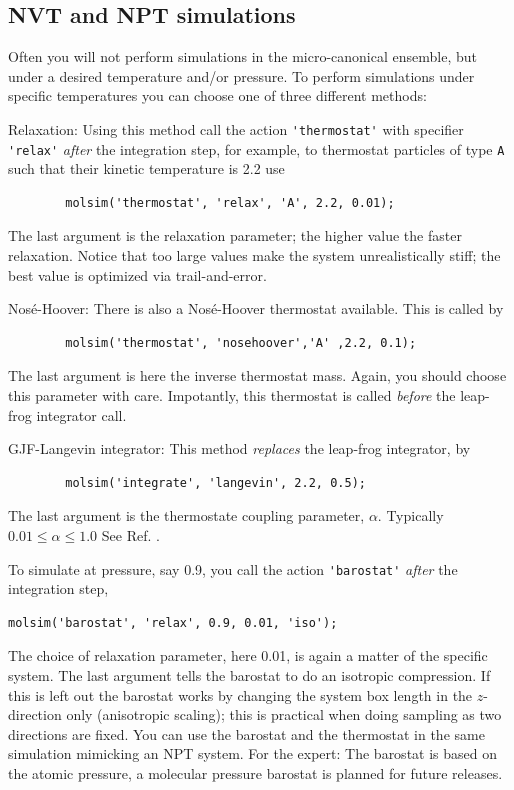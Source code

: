 \documentclass[11pt]{article}
\begin{document}
\subsection{NVT and NPT simulations}
Often you will not perform simulations in the micro-canonical
ensemble, but under a desired temperature and/or pressure. To perform
simulations under specific temperatures you can choose one of three
different methods:
\begin{description}
	\item{Relaxation:} 
		Using this method call the action \verb!'thermostat'! with specifier
		\verb!'relax'! \emph{after} the integration step, for example, to thermostat particles of type 
		\verb!A! such that their kinetic temperature is 2.2 use 
		\begin{verbatim}
		molsim('thermostat', 'relax', 'A', 2.2, 0.01);
		\end{verbatim}
		The last argument is the relaxation parameter; the higher value the faster
		relaxation. Notice that too large values make the system unrealistically
		stiff; the best value is optimized via trail-and-error. 
	\item{Nos\'{e}-Hoover:} 
		There is also a Nos\'{e}-Hoover thermostat available. This 
		is called by 
		\begin{verbatim}
		molsim('thermostat', 'nosehoover','A' ,2.2, 0.1);
		\end{verbatim}
		The last argument is here the inverse thermostat mass. Again, you should choose this parameter with care.
		Impotantly, this thermostat is called \emph{before} the leap-frog integrator call.
	\item{GJF-Langevin integrator:}
		This method \emph{replaces} the leap-frog integrator, by 
		\begin{verbatim}
		molsim('integrate', 'langevin', 2.2, 0.5);
		\end{verbatim}
		The last argument is the thermostate coupling parameter, $\alpha$. Typically $0.01 \leq \alpha \leq 1.0$ 
		See Ref. \cite{gjf}.
\end{description}

To simulate at pressure, say 0.9, you call the action \verb!'barostat'! 
\emph{after} the integration step,
\begin{verbatim}
molsim('barostat', 'relax', 0.9, 0.01, 'iso');
\end{verbatim}
The choice of relaxation parameter, here 0.01, is again a matter of the specific
system. The last argument tells the barostat to do an isotropic compression. If
this is left out the barostat works by changing the system box length in the
$z$-direction only (anisotropic scaling); this is practical when doing sampling
as two directions are fixed. You can use the barostat and the thermostat
in the same simulation mimicking an NPT system. For the expert: The barostat is
based on the atomic pressure, a molecular pressure barostat is planned for
future releases. 
\end{document}
